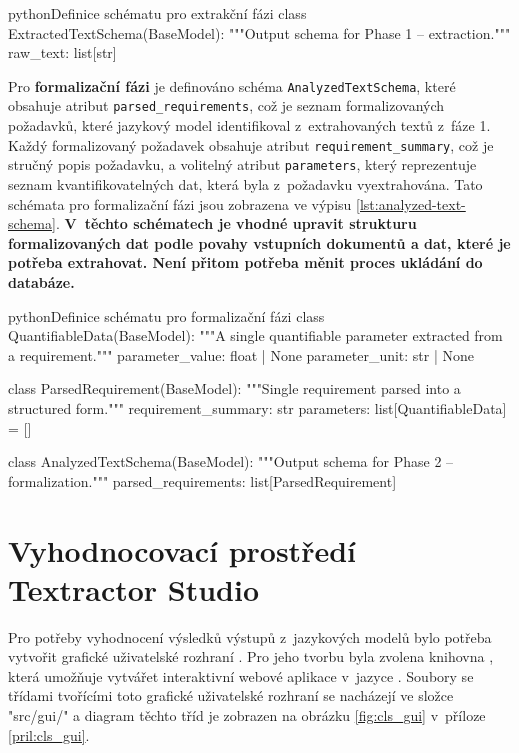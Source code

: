 \documentclass[czech, bc, kiv, he, iso690numb, pdf]{fasthesis}
\newcommand{\nobreakstart}
{
    \nopagebreak
    \begin{center}
        \begin{minipage}{\textwidth}  
}
\newcommand{\nobreakend}{
        \end{minipage}
    \end{center}
}
\begin{document}
\nobreakstart
\begin{code}{python}{Definice schématu pro extrakční fázi\label{lst:extracted-text-schema}}
class ExtractedTextSchema(BaseModel):
"""Output schema for Phase 1 -- extraction."""
raw_text: list[str]
\end{code}
\nobreakend

Pro \textbf{formalizační fázi} je definováno schéma \verb"AnalyzedTextSchema", které obsahuje atribut \verb"parsed_requirements", což je seznam formalizovaných požadavků, které jazykový model identifikoval z~extrahovaných textů z~fáze 1. Každý formalizovaný požadavek obsahuje atribut \verb"requirement_summary", což je stručný popis požadavku, a volitelný atribut \verb"parameters", který reprezentuje seznam kvantifikovatelných dat, která byla z~požadavku vyextrahována. Tato schémata pro formalizační fázi jsou zobrazena ve výpisu \ref{lst:analyzed-text-schema}. \textbf{V~těchto schématech je vhodné upravit strukturu formalizovaných dat podle povahy vstupních dokumentů a dat, které je potřeba extrahovat. Není přitom potřeba měnit proces ukládání do databáze.}

\nobreakstart
\begin{code}{python}{Definice schématu pro formalizační fázi\label{lst:analyzed-text-schema}}
class QuantifiableData(BaseModel):
    """A single quantifiable parameter extracted from a requirement."""
    parameter_value: float | None
    parameter_unit: str | None


class ParsedRequirement(BaseModel):
    """Single requirement parsed into a structured form."""
    requirement_summary: str
    parameters: list[QuantifiableData] = []


class AnalyzedTextSchema(BaseModel):
    """Output schema for Phase 2 -- formalization."""
    parsed_requirements: list[ParsedRequirement]
\end{code}
\nobreakend

\section{Vyhodnocovací prostředí Textractor Studio}
Pro potřeby vyhodnocení výsledků výstupů z~jazykových modelů bylo potřeba vytvořit grafické uživatelské rozhraní . Pro jeho tvorbu byla zvolena knihovna  \cite{streamlit}, která umožňuje vytvářet interaktivní webové aplikace v~jazyce . Soubory se třídami tvořícími toto grafické uživatelské rozhraní se nacházejí ve složce \filename"src/gui/" a diagram těchto tříd je zobrazen na obrázku \ref{fig:cls_gui} v~příloze \ref{pril:cls_gui}.
\end{document}
